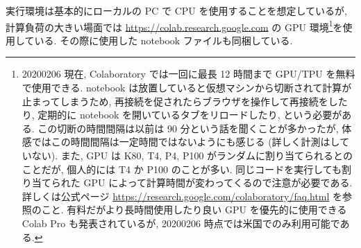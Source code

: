 実行環境は基本的にローカルの PC で CPU を使用することを想定しているが, 計算負荷の大きい場面では \href{https://colab.research.google.com}{https://colab.research.google.com} の GPU 環境\footnote{
20200206 現在, Colaboratory では一回に最長 12 時間まで GPU/TPU を無料で使用できる.
notebook は放置していると仮想マシンから切断されて計算が止まってしまうため, 再接続を促されたらブラウザを操作して再接続をしたり, 定期的に notebook を開いているタブをリロードしたり, という必要がある.
この切断の時間間隔は以前は 90 分という話を聞くことが多かったが, 体感ではこの時間間隔は一定時間ではないようにも感じる (詳しく計測はしていない).
また, GPU は K80, T4, P4, P100 がランダムに割り当てられるとのことだが, 個人的には T4 か P100 のことが多い.
同じコードを実行しても割り当てられた GPU によって計算時間が変わってくるので注意が必要である.
詳しくは公式ページ \href{https://research.google.com/colaboratory/faq.html}{https://research.google.com/colaboratory/faq.html} を参照のこと.
有料だがより長時間使用したり良い GPU を優先的に使用できる Colab Pro も発表されているが, 20200206 時点では米国でのみ利用可能である.
}を使用している.
その際に使用した notebook ファイルも同梱している.
